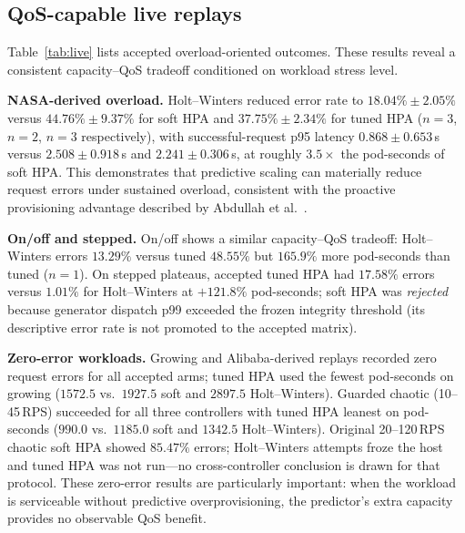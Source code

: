 \documentclass[journal]{IEEEtran}
\begin{document}
\subsection{QoS-capable live replays}
Table~\ref{tab:live} lists accepted overload-oriented outcomes. These results reveal a consistent capacity--QoS tradeoff conditioned on workload stress level.

\textbf{NASA-derived overload.} Holt--Winters reduced error rate to $18.04\% \pm 2.05\%$ versus $44.76\% \pm 9.37\%$ for soft HPA and $37.75\% \pm 2.34\%$ for tuned HPA ($n{=}3$, $n{=}2$, $n{=}3$ respectively), with successful-request p95 latency $0.868 \pm 0.653$\,s versus $2.508 \pm 0.918$\,s and $2.241 \pm 0.306$\,s, at roughly $3.5\times$ the pod-seconds of soft HPA. This demonstrates that predictive scaling can materially reduce request errors under sustained overload, consistent with the proactive provisioning advantage described by Abdullah et al.~\cite{abdullah2022}.

\textbf{On/off and stepped.} On/off shows a similar capacity--QoS tradeoff: Holt--Winters errors $13.29\%$ versus tuned $48.55\%$ but $165.9\%$ more pod-seconds than tuned ($n{=}1$). On stepped plateaus, accepted tuned HPA had $17.58\%$ errors versus $1.01\%$ for Holt--Winters at $+121.8\%$ pod-seconds; soft HPA was \emph{rejected} because generator dispatch p99 exceeded the frozen integrity threshold (its descriptive error rate is not promoted to the accepted matrix).

\textbf{Zero-error workloads.} Growing and Alibaba-derived replays recorded zero request errors for all accepted arms; tuned HPA used the fewest pod-seconds on growing ($1572.5$ vs.\ $1927.5$ soft and $2897.5$ Holt--Winters). Guarded chaotic (10--45\,RPS) succeeded for all three controllers with tuned HPA leanest on pod-seconds ($990.0$ vs.\ $1185.0$ soft and $1342.5$ Holt--Winters). Original 20--120\,RPS chaotic soft HPA showed $85.47\%$ errors; Holt--Winters attempts froze the host and tuned HPA was not run---no cross-controller conclusion is drawn for that protocol. These zero-error results are particularly important: when the workload is serviceable without predictive overprovisioning, the predictor's extra capacity provides no observable QoS benefit.
\end{document}
